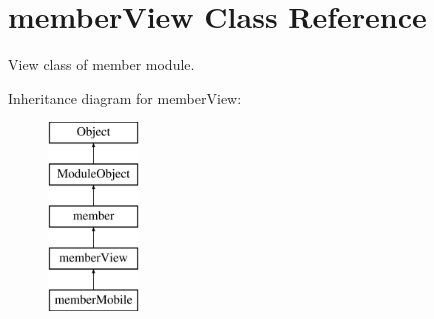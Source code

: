 \hypertarget{classmemberView}{\section{member\+View Class Reference}
\label{classmemberView}
}


View class of member module.  


Inheritance diagram for member\+View\+:\begin{figure}[H]
\begin{center}
\leavevmode
\includegraphics[height=5.000000cm]{classmemberView}
\end{center}
\end{figure}

